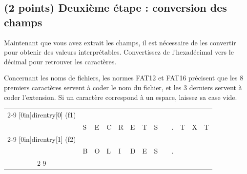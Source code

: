 \documentclass[11pt,a4paper]{article}
\begin{document}

\subsection{(2 points) Deuxième étape : conversion des champs }

Maintenant que vous avez extrait les champs, il est nécessaire de les convertir pour obtenir des valeurs interprétables.
Convertissez de l'hexadécimal vers le décimal pour retrouver les caractères.

Concernant les noms de fichiers, les normes FAT12 et FAT16 précisent que les 8 premiers caractères servent à coder le nom du fichier, et les 3 derniers servent à coder l'extension.
Si un caractère correspond à un espace, laissez sa case vide.

\medskip

\begin{center}


\begin{tabular}{ c   | m{0.45cm} | m{0.45cm} | m{0.45cm} | m{0.45cm} | m{0.45cm} | m{0.45cm} | m{0.45cm} | m{0.45cm} | c | m{0.45cm} | m{0.45cm} | m{0.45cm} | }
\cline{2-9} \cline{11-13}
\multirow[c]{2}{*}[0in]{direntry[0] (f1)}  &   &   &   &   &   &   &   &   &     &   &   &   \\
                                           & S & E & C & R & E & T & S &   &  .  & T & X & T \\
\cline{2-9} \cline{11-13}
\multirow[c]{2}{*}[0in]{direntry[1] (f2)}  &   &   &   &   &   &   &   &   &     &   &   &   \\
                                           & B & O & L & I & D & E & S &   &  .  &   &   &   \\
\cline{2-9} \cline{11-13}
\end{tabular}

\end{center}
\end{document}
